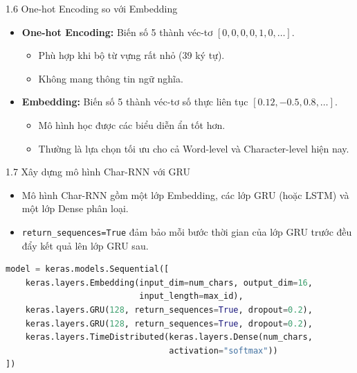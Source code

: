 \documentclass[aspectratio=169, 12pt]{beamer}
\begin{document}
\begin{frame}{1.6 One-hot Encoding so với Embedding}
    \begin{itemize}
        \item \textbf{One-hot Encoding:} Biến số 5 thành véc-tơ $[0, 0, 0, 0, 1, 0, \dots]$.
            \begin{itemize}
                \item Phù hợp khi bộ từ vựng rất nhỏ (39 ký tự).
                \item Không mang thông tin ngữ nghĩa.
            \end{itemize}
        \item \textbf{Embedding:} Biến số 5 thành véc-tơ số thực liên tục $[0.12, -0.5, 0.8, \dots]$.
            \begin{itemize}
                \item Mô hình học được các biểu diễn ẩn tốt hơn.
                \item Thường là lựa chọn tối ưu cho cả Word-level và Character-level hiện nay.
            \end{itemize}
    \end{itemize}
\end{frame}

\begin{frame}[fragile]{1.7 Xây dựng mô hình Char-RNN với GRU}
    \begin{itemize}
        \item Mô hình Char-RNN gồm một lớp Embedding, các lớp GRU (hoặc LSTM) và một lớp Dense phân loại.
        \item \texttt{return\_sequences=True} đảm bảo mỗi bước thời gian của lớp GRU trước đều đẩy kết quả lên lớp GRU sau.
    \end{itemize}
\begin{lstlisting}[language=Python]
model = keras.models.Sequential([
    keras.layers.Embedding(input_dim=num_chars, output_dim=16, 
                           input_length=max_id),
    keras.layers.GRU(128, return_sequences=True, dropout=0.2),
    keras.layers.GRU(128, return_sequences=True, dropout=0.2),
    keras.layers.TimeDistributed(keras.layers.Dense(num_chars, 
                                 activation="softmax"))
])
\end{lstlisting}
\end{frame}
\end{document}
